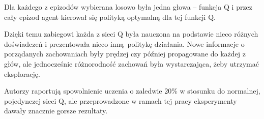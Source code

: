 Dla każdego z epizodów wybierana losowo była jedna głowa – funkcja Q i przez cały epizod agent kierował się polityką optymalną dla tej funkcji Q.

Dzięki temu zabiegowi każda z sieci Q była nauczona na podstawie nieco różnych doświadczeń i prezentowała nieco inną politykę działania. Nowe informacje o porządanych zachowaniach były prędzej czy później propagowane do każdej z głów, ale jednocześnie różnorodność zachowań była wystarczająca, żeby utrzymać eksplorację.

Autorzy raportują spowolnienie uczenia o zaledwie 20\% w stosunku do normalnej, pojedynczej sieci Q, ale przeprowadzone w ramach tej pracy eksperymenty dawały znacznie gorsze rezultaty.
